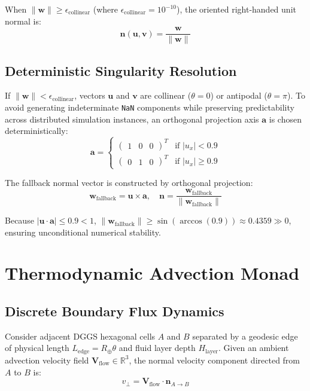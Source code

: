 \documentclass[10pt,journal,compsoc]{IEEEtran}
\begin{document}
When $\|\mathbf{w}\| \ge \epsilon_{\text{collinear}}$ (where $\epsilon_{\text{collinear}} = 10^{-10}$), the oriented right-handed unit normal is:
\begin{equation}
\mathbf{n}(\mathbf{u}, \mathbf{v}) = \frac{\mathbf{w}}{\|\mathbf{w}\|}
\end{equation}

\subsection{Deterministic Singularity Resolution}
If $\|\mathbf{w}\| < \epsilon_{\text{collinear}}$, vectors $\mathbf{u}$ and $\mathbf{v}$ are collinear ($\theta = 0$) or antipodal ($\theta = \pi$). To avoid generating indeterminate \texttt{NaN} components while preserving predictability across distributed simulation instances, an orthogonal projection axis $\mathbf{a}$ is chosen deterministically:
\begin{equation}
\mathbf{a} = \begin{cases}
\begin{pmatrix} 1 & 0 & 0 \end{pmatrix}^T & \text{if } |u_x| < 0.9 \\
\begin{pmatrix} 0 & 1 & 0 \end{pmatrix}^T & \text{if } |u_x| \ge 0.9
\end{cases}
\end{equation}

The fallback normal vector is constructed by orthogonal projection:
\begin{equation}
\mathbf{w}_{\text{fallback}} = \mathbf{u} \times \mathbf{a}, \quad \mathbf{n} = \frac{\mathbf{w}_{\text{fallback}}}{\|\mathbf{w}_{\text{fallback}}\|}
\end{equation}

Because $|\mathbf{u} \cdot \mathbf{a}| \le 0.9 < 1$, $\|\mathbf{w}_{\text{fallback}}\| \ge \sin(\arccos(0.9)) \approx 0.4359 \gg 0$, ensuring unconditional numerical stability.

\section{Thermodynamic Advection Monad}

\subsection{Discrete Boundary Flux Dynamics}
Consider adjacent DGGS hexagonal cells $A$ and $B$ separated by a geodesic edge of physical length $L_{\text{edge}} = R_{\oplus} \theta$ and fluid layer depth $H_{\text{layer}}$. Given an ambient advection velocity field $\mathbf{V}_{\text{flow}} \in \mathbb{R}^3$, the normal velocity component directed from $A$ to $B$ is:
\begin{equation}
v_{\perp} = \mathbf{V}_{\text{flow}} \cdot \mathbf{n}_{A \to B}
\end{equation}
\end{document}
